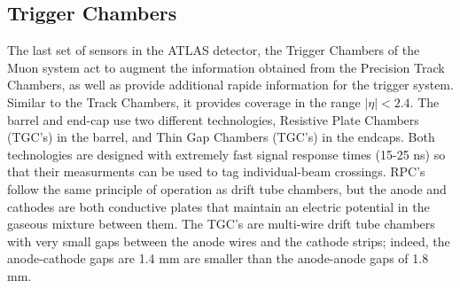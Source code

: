     \subsection{Trigger Chambers}
        The last set of sensors in the ATLAS detector, the Trigger Chambers of the Muon system act to augment the information obtained from the Precision Track Chambers, as well as provide additional rapide information for the trigger system.
        Similar to the Track Chambers, it provides coverage in the range $|\eta| < 2.4$.
        The barrel and end-cap use two different technologies, Resistive Plate Chambers (TGC's) in the barrel, and Thin Gap Chambers (TGC's) in the endcaps.
        Both technologies are designed with extremely fast signal response times (15-25 ns) so that their measurments can be used to tag individual-beam crossings.
        RPC's follow the same principle of operation as drift tube chambers, but the anode and cathodes are both conductive plates that maintain an electric potential in the gaseous mixture between them.
        The TGC's are multi-wire drift tube chambers with very small gaps between the anode wires and the cathode strips; indeed, the anode-cathode gaps are 1.4 mm are smaller than the anode-anode gaps of 1.8 mm.

    
